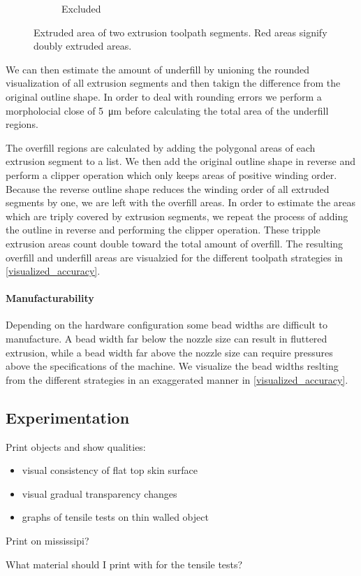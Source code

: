 \begin{figure}
\begin{subfigure}{\figwidth}
\caption{Excluded}
\end{subfigure}
\caption{
Extruded area of two extrusion toolpath segments.
Red areas signify doubly extruded areas.
}
\label{segment_visualization}
\end{figure}

We can then estimate the amount of underfill by unioning the rounded visualization of all extrusion segments and then takign the difference from the original outline shape.
In order to deal with rounding errors we perform a morpholocial close of \SI{5}{\micro\meter} before calculating the total area of the underfill regions.

The overfill regions are calculated by adding the polygonal areas of each extrusion segment to a list.
We then add the original outline shape in reverse and perform a clipper operation which only keeps areas of positive winding order.
Because the reverse outline shape reduces the winding order of all extruded segments by one, we are left with the overfill areas.
In order to estimate the areas which are triply covered by extrusion segments, we repeat the process of adding the outline in reverse and performing the clipper operation.
These tripple extrusion areas count double toward the total amount of overfill.
The resulting overfill and underfill areas are visualzied for the different toolpath strategies in \cref{visualized_accuracy}.





\paragraph{Manufacturability}
Depending on the hardware configuration some bead widths are difficult to manufacture.
A bead width far below the nozzle size can result in fluttered extrusion, while a bead width far above the nozzle size can require pressures above the specifications of the machine.
We visualize the bead widths reslting from the different strategies in an exaggerated manner in \cref{visualized_accuracy}.





\subsection{Experimentation}
Print objects and show qualities:
\begin{itemize}
\item visual consistency of flat top skin surface
\item visual gradual transparency changes
\item graphs of tensile tests on thin walled object
\end{itemize}

Print on mississipi?

What material should I print with for the tensile tests?









